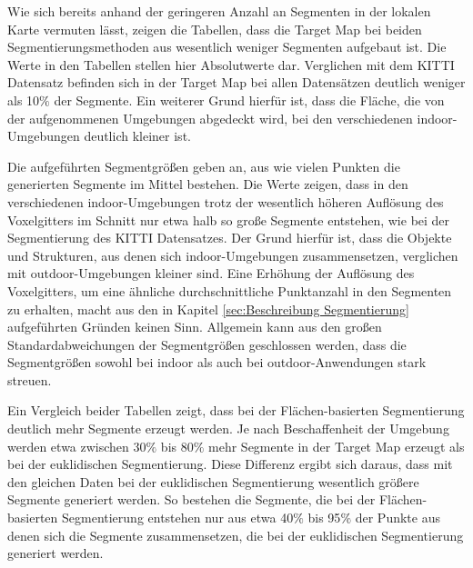 Wie sich bereits anhand der geringeren Anzahl an Segmenten in der lokalen Karte vermuten lässt, zeigen die Tabellen, dass die Target Map bei beiden Segmentierungsmethoden aus wesentlich weniger Segmenten aufgebaut ist. Die Werte in den Tabellen stellen hier Absolutwerte dar. Verglichen mit dem KITTI Datensatz befinden sich in der Target Map bei allen Datensätzen deutlich weniger als 10$\%$ der Segmente. Ein weiterer Grund hierfür ist, dass die Fläche, die von der aufgenommenen Umgebungen abgedeckt wird, bei den verschiedenen indoor-Umgebungen deutlich kleiner ist. 
 
Die aufgeführten Segmentgrößen geben an, aus wie vielen Punkten die generierten Segmente im Mittel bestehen. Die Werte zeigen, dass in den verschiedenen indoor-Umgebungen trotz der wesentlich höheren Auflösung des Voxelgitters im Schnitt nur etwa  halb so große Segmente entstehen, wie bei der Segmentierung des KITTI Datensatzes. Der Grund hierfür ist, dass die Objekte und Strukturen, aus denen sich indoor-Umgebungen zusammensetzen, verglichen mit outdoor-Umgebungen kleiner sind. Eine Erhöhung der Auflösung des Voxelgitters, um eine ähnliche durchschnittliche Punktanzahl in den Segmenten zu erhalten, macht aus den in Kapitel \ref{sec:Beschreibung Segmentierung} aufgeführten Gründen keinen Sinn. Allgemein kann aus den großen Standardabweichungen der Segmentgrößen geschlossen werden, dass die Segmentgrößen sowohl bei indoor als auch bei outdoor-Anwendungen stark streuen. 

Ein Vergleich beider Tabellen zeigt, dass bei der Flächen-basierten Segmentierung deutlich mehr Segmente erzeugt werden. Je nach Beschaffenheit der Umgebung werden etwa zwischen 30$\%$ bis 80$\%$ mehr Segmente in der Target Map erzeugt als bei der euklidischen Segmentierung. Diese Differenz ergibt sich daraus, dass mit den gleichen Daten bei der euklidischen Segmentierung wesentlich größere Segmente generiert werden. So bestehen die Segmente, die bei der Flächen-basierten Segmentierung entstehen nur aus etwa 40$\%$ bis 95$\%$ der Punkte aus denen sich die Segmente zusammensetzen, die bei der euklidischen Segmentierung generiert werden. 

